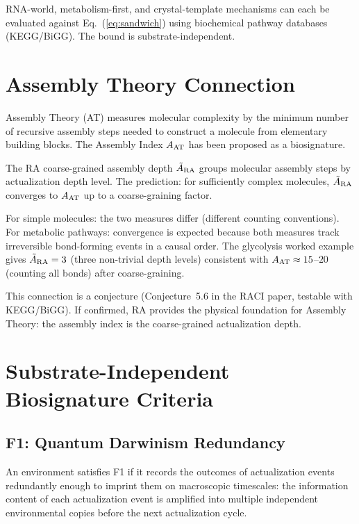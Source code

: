 \documentclass[12pt,a4paper]{article}
\begin{document}
RNA-world, metabolism-first, and crystal-template mechanisms can each be evaluated against Eq.~(\ref{eq:sandwich}) using biochemical pathway databases (KEGG/BiGG).  The bound is substrate-independent.

\section{Assembly Theory Connection}\label{sec:assembly}

Assembly Theory (AT) \cite{Cronin2016,Walker2023} measures molecular complexity by the minimum number of recursive assembly steps needed to construct a molecule from elementary building blocks.  The Assembly Index $A_{\rm AT}$ has been proposed as a biosignature.

The RA coarse-grained assembly depth $\tilde{A}_{\rm RA}$ groups molecular assembly steps by actualization depth level.  The prediction: for sufficiently complex molecules, $\tilde{A}_{\rm RA}$ converges to $A_{\rm AT}$ up to a coarse-graining factor.

For simple molecules: the two measures differ (different counting conventions).  For metabolic pathways: convergence is expected because both measures track irreversible bond-forming events in a causal order.  The glycolysis worked example gives $\tilde{A}_{\rm RA}=3$ (three non-trivial depth levels) consistent with $A_{\rm AT}\approx15$--$20$ (counting all bonds) after coarse-graining.

This connection is a conjecture (Conjecture~5.6 in the RACI paper, testable with KEGG/BiGG).  If confirmed, RA provides the physical foundation for Assembly Theory: the assembly index is the coarse-grained actualization depth.

\section{Substrate-Independent Biosignature Criteria}\label{sec:criteria}

\subsection{F1: Quantum Darwinism Redundancy}

\begin{definition}[Condition F1]
An environment satisfies \textup{F1} if it records the outcomes of actualization events redundantly enough to imprint them on macroscopic timescales: the information content of each actualization event is amplified into multiple independent environmental copies before the next actualization cycle.
\end{definition}
\end{document}
